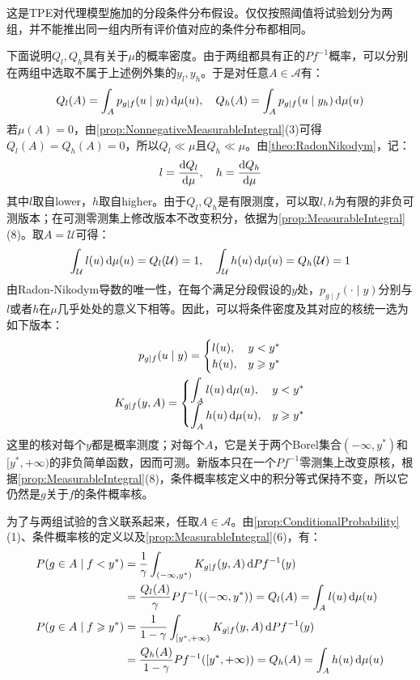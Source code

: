 这是TPE对代理模型施加的分段条件分布假设。仅仅按照阈值将试验划分为两组，并不能推出同一组内所有评价值对应的条件分布都相同。\par
下面说明$Q_l,Q_h$具有关于$\mu$的概率密度。由于两组都具有正的$Pf^{-1}$概率，可以分别在两组中选取不属于上述例外集的$y_l,y_h$。于是对任意$A\in\mathscr{A}$有：
\begin{equation*}
	Q_l(A)=\int_Ap_{g\mid f}(u\mid y_l)\mathop{}\!\mathrm{d}\mu(u),\quad
	Q_h(A)=\int_Ap_{g\mid f}(u\mid y_h)\mathop{}\!\mathrm{d}\mu(u)
\end{equation*}
若$\mu(A)=0$，由\cref{prop:NonnegativeMeasurableIntegral}(3)可得$Q_l(A)=Q_h(A)=0$，所以$Q_l\ll\mu$且$Q_h\ll\mu$。由\cref{theo:RadonNikodym}，记：
\begin{equation*}
	l=\frac{\mathop{}\!\mathrm{d} Q_l}{\mathop{}\!\mathrm{d}\mu},\quad h=\frac{\mathop{}\!\mathrm{d} Q_h}{\mathop{}\!\mathrm{d}\mu}
\end{equation*}
其中$l$取自lower，$h$取自higher。由于$Q_l,Q_h$是有限测度，可以取$l,h$为有限的非负可测版本；在可测零测集上修改版本不改变积分，依据为\cref{prop:MeasurableIntegral}(8)。取$A=\mathcal{U}$可得：
\begin{equation*}
	\int_{\mathcal{U}}l(u)\mathop{}\!\mathrm{d}\mu(u)=Q_l(\mathcal{U})=1,\quad
	\int_{\mathcal{U}}h(u)\mathop{}\!\mathrm{d}\mu(u)=Q_h(\mathcal{U})=1
\end{equation*}
由Radon-Nikodym导数的唯一性，在每个满足分段假设的$y$处，$p_{g\mid f}(\cdot\mid y)$分别与$l$或者$h$在$\mu$几乎处处的意义下相等。因此，可以将条件密度及其对应的核统一选为如下版本：
\begin{gather*}
	p_{g\mid f}(u\mid y)=
	\begin{cases}
		l(u),&y<y^* \\
		h(u),&y\geqslant y^*
	\end{cases} \\
	K_{g\mid f}(y,A)=
	\begin{cases}
		\displaystyle\int_A l(u)\mathop{}\!\mathrm{d}\mu(u),&y<y^* \\
		\displaystyle\int_A h(u)\mathop{}\!\mathrm{d}\mu(u),&y\geqslant y^*
	\end{cases}
\end{gather*}
这里的核对每个$y$都是概率测度；对每个$A$，它是关于两个Borel集合$(-\infty,y^*)$和$[y^*,+\infty)$的非负简单函数，因而可测。新版本只在一个$Pf^{-1}$零测集上改变原核，根据\cref{prop:MeasurableIntegral}(8)，条件概率核定义中的积分等式保持不变，所以它仍然是$g$关于$f$的条件概率核。\par
为了与两组试验的含义联系起来，任取$A\in\mathscr{A}$。由\cref{prop:ConditionalProbability}(1)、条件概率核的定义以及\cref{prop:MeasurableIntegral}(6)，有：
\begin{align*}
	P(g\in A\mid f<y^*)
	&=\frac{1}{\gamma}\int_{(-\infty,y^*)}K_{g\mid f}(y,A)\mathop{}\!\mathrm{d} Pf^{-1}(y) \\
	&=\frac{Q_l(A)}{\gamma}Pf^{-1}((-\infty,y^*))
	=Q_l(A)=\int_A l(u)\mathop{}\!\mathrm{d}\mu(u) \\
	P(g\in A\mid f\geqslant y^*)
	&=\frac{1}{1-\gamma}\int_{[y^*,+\infty)}K_{g\mid f}(y,A)\mathop{}\!\mathrm{d} Pf^{-1}(y) \\
	&=\frac{Q_h(A)}{1-\gamma}Pf^{-1}([y^*,+\infty))
	=Q_h(A)=\int_A h(u)\mathop{}\!\mathrm{d}\mu(u)
\end{align*}
